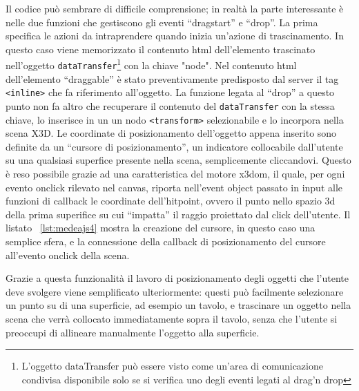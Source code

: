 Il codice può sembrare di difficile comprensione; in realtà la parte interessante è nelle due funzioni che gestiscono gli eventi ``dragstart'' e ``drop''. La prima specifica le azioni da intraprendere quando inizia un'azione di trascinamento. In questo caso viene memorizzato il contenuto html dell'elemento trascinato nell'oggetto \texttt{dataTransfer}\footnote{L'oggetto dataTransfer può essere visto come un'area di comunicazione condivisa disponibile solo se si verifica uno degli eventi legati al drag'n drop} con la chiave "node". Nel contenuto html dell'elemento ``draggable'' è stato preventivamente predisposto dal server il tag \texttt{<inline>} che fa riferimento all'oggetto. La funzione legata al ``drop'' a questo punto non fa altro che recuperare il contenuto del \texttt{dataTransfer} con la stessa chiave, lo inserisce in un un nodo \texttt{<transform>} selezionabile e lo incorpora nella scena X3D. 
Le coordinate di posizionamento dell'oggetto appena inserito sono definite da un ``cursore di posizionamento'', un indicatore collocabile dall'utente su una qualsiasi superfice presente nella scena, semplicemente cliccandovi. Questo è reso possibile grazie ad una caratteristica del motore x3dom, il quale, per ogni evento onclick rilevato nel canvas, riporta nell'event object passato in input alle funzioni di callback le coordinate dell'hitpoint, ovvero il punto nello spazio 3d della prima superifice su cui ``impatta'' il raggio proiettato dal click dell'utente. Il listato ~\ref{lst:medeajs4} mostra la creazione del cursore, in questo caso una semplice sfera, e la connessione della callback di posizionamento del cursore all'evento onclick della scena.


Grazie a questa funzionalità il lavoro di posizionamento degli oggetti che l'utente deve svolgere viene semplificato ulteriormente: questi può facilmente selezionare un punto su di una superficie, ad esempio un tavolo, e trascinare un oggetto nella scena che verrà collocato immediatamente sopra il tavolo, senza che l'utente si preoccupi di allineare manualmente l'oggetto alla superficie.  

